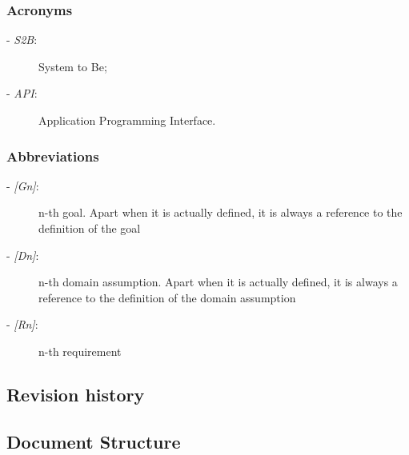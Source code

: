 	\subsubsection{Acronyms}
		\begin{description}
		\item[- \textit{S2B}:] System to Be;
		\item[- \textit{API}:] Application Programming Interface.
	\end{description}
	\subsubsection{Abbreviations}
		\begin{description}
			\item[- \textit{[Gn]}:] n-th goal. Apart when it is actually defined, it is always a reference to the definition of the goal
			\item[- \textit{[Dn]}:] n-th domain assumption. Apart when it is actually defined, it is always a reference to the definition of the domain assumption
			\item[- \textit{[Rn]}:] n-th requirement
		\end{description}
\subsection{Revision history}
\subsection{Document Structure}